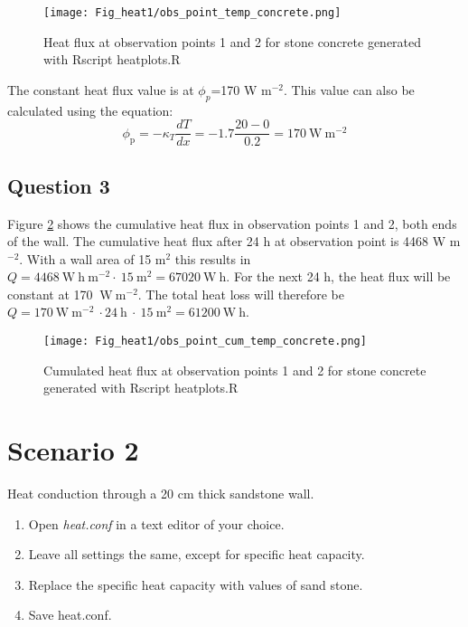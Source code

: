 \begin{figure}[!h]
\centering
\texttt{[image: Fig\_heat1/obs\_point\_temp\_concrete.png]}
\caption{\label{plot2} Heat flux at observation points 1 and 2 for stone concrete generated with Rscript heatplots.R}
\end{figure}

The constant heat flux value is at $\phi_{p}$=170 W m$^{-2}$. This value can also be calculated using the equation:
\begin{equation*}
\phi_{\mathrm{p}}=-\kappa_T \frac{dT}{dx}= -1.7 \frac{20-0}{0.2}= 170 \mathrm{~W~m^{-2}}
\end{equation*}

\newpage
\subsection*{Question 3}

Figure \ref{plot3} shows the cumulative heat flux in observation points 1 and 2, both ends of the wall. The cumulative heat flux after 24 h at observation point is 4468 W m$^{-2}$. With a wall area of 15 m$^2$ this results in $Q = 4468~\mathrm{W~h~m^{-2}}\cdot~15~\mathrm{m^{2}}= 67020 ~\mathrm{W~h}$. 
For the next 24 h, the heat flux will be constant at 170 $\mathrm{~W~m^{-2}}$. The total heat loss will therefore be $Q=170 \mathrm{~W~m^{-2}}~\cdot 24~\mathrm{h}~\cdot~15~\mathrm{m^{2}}=61200 \mathrm{~W~h}$.

\begin{figure}[!h]
\centering
\texttt{[image: Fig\_heat1/obs\_point\_cum\_temp\_concrete.png]}
\caption{\label{plot3} Cumulated heat flux at observation points 1 and 2 for stone concrete generated with Rscript heatplots.R}
\end{figure}

\newpage

\section*{Scenario 2}
Heat conduction through a 20 cm thick sandstone wall. 

\begin{enumerate}
\item Open \emph{heat.conf} in a text editor of your choice. 
\item Leave all settings the same, except for specific heat capacity. 
\item Replace the specific heat capacity with values of sand stone.
\item Save heat.conf.
\end{enumerate}

